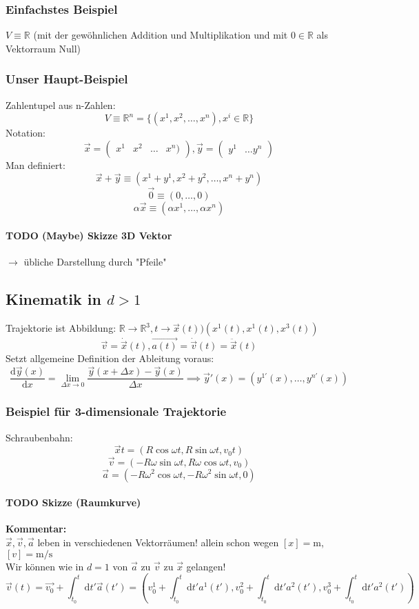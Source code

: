 \documentclass[a4paper]{scrartcl}
\theoremstyle{definition}
\theoremstyle{plain}
\theoremstyle{remark}
\theoremstyle{remark}
\begin{document}
\subsubsection{Einfachstes Beispiel}
\label{sec-2-4-1}
$V\equiv \mathbb{R}$ (mit der gewöhnlichen Addition und Multiplikation und mit $0\in\mathbb{R}$ als Vektorraum Null)
\subsubsection{Unser Haupt-Beispiel}
\label{sec-2-4-2}
Zahlentupel aus n-Zahlen:
\[V\equiv \mathbb{R}^n = \{(x^1,x^2,\ldots,x^n), x^i \in\mathbb{R}\}\]
Notation:
\[\vec{x} = \begin{pmatrix} x^1& x^2 & \ldots & x^n)\end{pmatrix}, \vec{y} = \begin{pmatrix} y^1 & \ldots y^n \end{pmatrix}\]
Man definiert:
\[\vec{x} + \vec{y} \equiv (x^1 + y^1, x^2 + y^2, \ldots, x^n + y^n)\]
\[\vec{0} \equiv (0,\ldots,0)\]
\[\alpha \vec{x} \equiv (\alpha x^1, \ldots, \alpha x^n)\]
\paragraph{{\bfseries\sffamily TODO} (Maybe) Skizze 3D Vektor}
\label{sec-2-4-2-1}
$\rightarrow$ übliche Darstellung durch "Pfeile"
\subsection{Kinematik in $d>1$}
\label{sec-2-5}
Trajektorie ist Abbildung: $\mathbb{R} \to \mathbb{R}^3, t\to \vec{x}(t) ) (x^1(t),x^1(t),x^3(t))$
\[\vec{v} = \dot{\vec{x}}(t), \vec{a(t)} = \dot{\vec{v}}(t) = \ddot{\vec{x}}(t)\]
Setzt allgemeine Definition der Ableitung voraus:
\[\frac{\mathrm{d}\vec{y}(x)}{\mathrm{d}x} = \lim_{\Delta x \to 0} \frac{\vec{y}(x + \Delta x) - \vec{y}(x)}{\Delta x}  \implies \vec{y}'(x) = (y^{1'}(x), \ldots,y^{n'}(x))\]
\subsubsection{Beispiel für 3-dimensionale Trajektorie}
\label{sec-2-5-1}
Schraubenbahn:
\[\vec{x}t = (R\cos{\omega t},R\sin{\omega t}, v_0 t)\]
\[\vec{v} = (-R\omega\sin{\omega t}, R\omega\cos{\omega t}, v_0)\]
\[\vec{a} = (-R\omega^2\cos{\omega t}, -R\omega^2\sin{\omega t}, 0)\]
\paragraph{{\bfseries\sffamily TODO} Skizze (Raumkurve)}
\label{sec-2-5-1-1}
\textbf{Kommentar:} \\
         $\vec{x},\vec{v},\vec{a}$ leben in verschiedenen Vektorräumen!
allein schon wegen $[x] = \si{\meter}$, $[v] = \si{\meter\per\second}$ \\
         Wir können wie in $d=1$ von $\vec{a}$ zu $\vec{v}$ zu $\vec{x}$ gelangen!
\[\vec{v}(t) = \vec{v_0} + \int_{t_0}^{t} \mathrm{d}t' \vec{a}(t') = (v_0^1 + \int_{t_0}^t \mathrm{d}t' a^1(t'), v_0^2 + \int_{t_0}^t \mathrm{d}t' a^2(t'), v_0^3 + \int_{t_0}^t \mathrm{d}t' a^2(t'))\]
\end{document}
